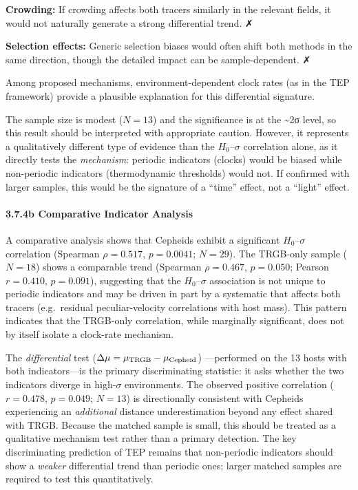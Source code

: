 \documentclass[
]{article}
\begin{document}
\textbf{Crowding:} If crowding affects both tracers similarly in the
relevant fields, it would not naturally generate a strong differential
trend. ✗

\textbf{Selection effects:} Generic selection biases would often shift
both methods in the same direction, though the detailed impact can be
sample-dependent. ✗

Among proposed mechanisms, environment-dependent clock rates (as in the
TEP framework) provide a plausible explanation for this differential
signature.

The sample size is modest (\(N=13\)) and the significance is at the
\textasciitilde2σ level, so this result should be interpreted with
appropriate caution. However, it represents a qualitatively different
type of evidence than the \(H_0\)--\(\sigma\) correlation alone, as it
directly tests the \emph{mechanism}: periodic indicators (clocks) would
be biased while non-periodic indicators (thermodynamic thresholds) would
not. If confirmed with larger samples, this would be the signature of a
``time'' effect, not a ``light'' effect.

\paragraph{3.7.4b Comparative Indicator
Analysis}\label{b-comparative-indicator-analysis}

A comparative analysis shows that Cepheids exhibit a significant
\(H_0\)--\(\sigma\) correlation (Spearman \(\rho = 0.517\),
\(p = 0.0041\); \(N=29\)). The TRGB-only sample (\(N=18\)) shows a
comparable trend (Spearman \(\rho = 0.467\), \(p = 0.050\); Pearson
\(r = 0.410\), \(p = 0.091\)), suggesting that the \(H_0\)--\(\sigma\)
association is not unique to periodic indicators and may be driven in
part by a systematic that affects both tracers (e.g.~residual
peculiar-velocity correlations with host mass). This pattern indicates
that the TRGB-only correlation, while marginally significant, does not
by itself isolate a clock-rate mechanism.

The \emph{differential} test
(\(\Delta\mu = \mu_{\rm TRGB} - \mu_{\rm Cepheid}\)) ---performed on the
13 hosts with both indicators---is the primary discriminating statistic:
it asks whether the two indicators diverge in high-\(\sigma\)
environments. The observed positive correlation (\(r = 0.478\),
\(p = 0.049\); \(N=13\)) is directionally consistent with Cepheids
experiencing an \emph{additional} distance underestimation beyond any
effect shared with TRGB. Because the matched sample is small, this
should be treated as a qualitative mechanism test rather than a primary
detection. The key discriminating prediction of TEP remains that
non-periodic indicators should show a \emph{weaker} differential trend
than periodic ones; larger matched samples are required to test this
quantitatively.
\end{document}
